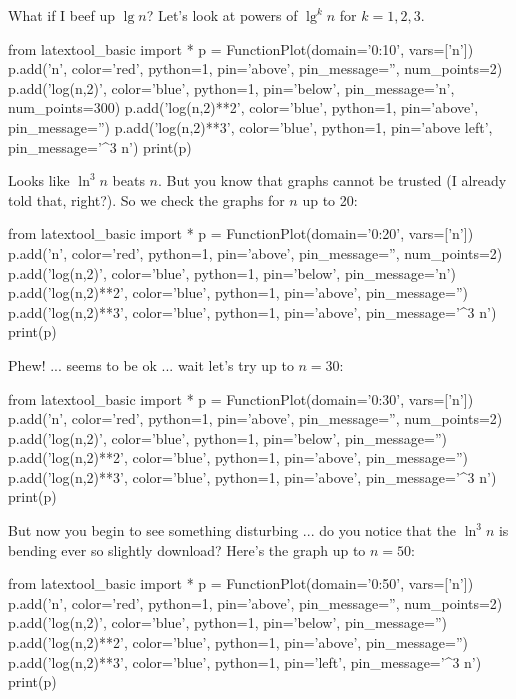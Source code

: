 What if I beef up $\lg n$?
Let's look at powers of $\lg^k n$ for $k = 1, 2, 3$.

\begin{python}
from latextool_basic import *
p = FunctionPlot(domain='0:10', vars=['n'])
p.add('n', color='red', python=1, pin='above', pin_message='', num_points=2)
p.add('log(n,2)', color='blue', python=1, pin='below', pin_message='\lg n', num_points=300)
p.add('log(n,2)**2', color='blue', python=1, pin='above', pin_message='')
p.add('log(n,2)**3', color='blue', python=1, pin='above left', pin_message='\lg^3 n')
print(p)
\end{python}

Looks like $\ln^3 n$ beats $n$.
But you know that graphs cannot be trusted (I already told that, right?).
So we check the graphs for $n$ up to 20:
\begin{python}
from latextool_basic import *
p = FunctionPlot(domain='0:20', vars=['n'])
p.add('n', color='red', python=1, pin='above', pin_message='', num_points=2)
p.add('log(n,2)', color='blue', python=1, pin='below', pin_message='\lg n')
p.add('log(n,2)**2', color='blue', python=1, pin='above', pin_message='')
p.add('log(n,2)**3', color='blue', python=1, pin='above', pin_message='\lg^3 n')
print(p)
\end{python}

Phew! ... seems to be ok ... wait let's try up to $n = 30$:
\begin{python}
from latextool_basic import *
p = FunctionPlot(domain='0:30', vars=['n'])
p.add('n', color='red', python=1, pin='above', pin_message='', num_points=2)
p.add('log(n,2)', color='blue', python=1, pin='below', pin_message='')
p.add('log(n,2)**2', color='blue', python=1, pin='above', pin_message='')
p.add('log(n,2)**3', color='blue', python=1, pin='above', pin_message='\lg^3 n')
print(p)
\end{python}
But now you begin to see something disturbing ... do you notice that
the $\ln^3 n$ is bending ever so slightly download?
Here's the graph up to $n = 50$:
\begin{python}
from latextool_basic import *
p = FunctionPlot(domain='0:50', vars=['n'])
p.add('n', color='red', python=1, pin='above', pin_message='', num_points=2)
p.add('log(n,2)', color='blue', python=1, pin='below', pin_message='')
p.add('log(n,2)**2', color='blue', python=1, pin='above', pin_message='')
p.add('log(n,2)**3', color='blue', python=1, pin='left', pin_message='\lg^3 n')
print(p)
\end{python}

